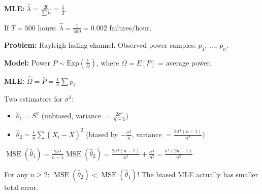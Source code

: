\textbf{MLE:} $\hat{\lambda} = \frac{20}{\sum t_{i}} = \frac{1}{\bar{T}}$

If $\bar{T} = 500$ hours: $\hat{\lambda} = \frac{1}{500} = 0.002$ failures/hour.


\textbf{Problem:} Rayleigh fading channel. Observed power samples: $p_{1},\, \ldots,\, p_{n}$.

\textbf{Model:} Power $P \sim \mathrm{Exp}\left(\frac{1}{\Omega}\right)$, where $\Omega = E[P]$ = average power.

\textbf{MLE:} $\hat{\Omega} = \bar{P} = \frac{1}{n}\sum p_{i}$



Two estimators for $\sigma^{2}$:

\begin{itemize}
\tightlist
\item
  $\hat{\theta}_{1} = S^{2}$ (unbiased, variance $= \frac{2\sigma^{4}}{n-1}$)
\item
  $\hat{\theta}_{2} = \frac{1}{n}\sum (X_{i}-\bar{X})^{2}$ (biased by $-\frac{\sigma^{2}}{n}$, variance $= \frac{2\sigma^{4}(n-1)}{n^{2}}$)
\end{itemize}

$\displaystyle \operatorname{MSE}(\hat{\theta}_{1}) = \frac{2\sigma^{4}}{n-1}$\PSbr{}$\displaystyle \operatorname{MSE}(\hat{\theta}_{2}) = \frac{2\sigma^{4}(n-1)}{n^{2}} + \frac{\sigma^{4}}{n^{2}} = \frac{\sigma^{4}(2n-1)}{n^{2}}$

For any $n \ge 2$: $\operatorname{MSE}(\hat{\theta}_{2}) < \operatorname{MSE}(\hat{\theta}_{1})$! The biased MLE actually has smaller total error.


